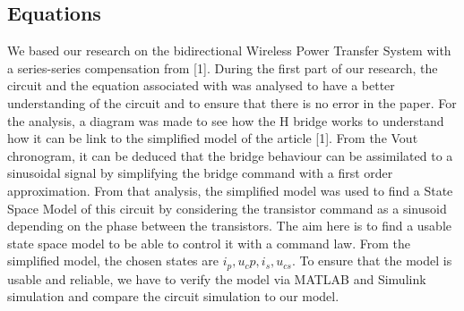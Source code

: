 \documentclass[conference]{IEEEtran}
\begin{document}
\subsection{Equations}
We based our research on the bidirectional Wireless Power Transfer System with a
series-series compensation from [1]. During the first part of our research, the circuit and
the equation associated with was analysed to have a better understanding of the circuit
and to ensure that there is no error in the paper.
For the analysis, a diagram was made to see how the H bridge works to understand how
it can be link to the simplified model of the article [1]. From the Vout chronogram, it can be
deduced that the bridge behaviour can be assimilated to a sinusoidal signal by
simplifying the bridge command with a first order approximation. From that analysis, the
simplified model was used to find a State Space Model of this circuit by considering the
transistor command as a sinusoid depending on the phase between the transistors. The
aim here is to find a usable state space model to be able to control it with a command
law.
From the simplified model, the chosen states are  \(i_p, u_cp, i_s, u_{cs}\).
To ensure that the model is usable and reliable, we have to verify the model via MATLAB
and Simulink simulation and compare the circuit simulation to our model.
\end{document}
